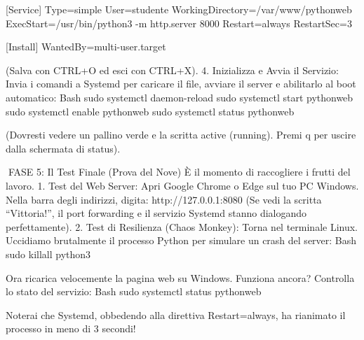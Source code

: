 \documentclass[11pt,a4paper]{article}
\begin{document}
{[}Service{]} Type=simple User=studente
WorkingDirectory=/var/www/pythonweb ExecStart=/usr/bin/python3 -m
http.server 8000 Restart=always RestartSec=3

{[}Install{]} WantedBy=multi-user.target

(Salva con CTRL+O ed esci con CTRL+X). 4. Inizializza e Avvia il
Servizio: Invia i comandi a Systemd per caricare il file, avviare il
server e abilitarlo al boot automatico: Bash sudo systemctl
daemon-reload sudo systemctl start pythonweb sudo systemctl enable
pythonweb sudo systemctl status pythonweb

(Dovresti vedere un pallino verde e la scritta active (running). Premi q
per uscire dalla schermata di status).

FASE 5: Il Test Finale (Prova del Nove) È il momento di raccogliere i
frutti del lavoro. 1. Test del Web Server: Apri Google Chrome o Edge sul
tuo PC Windows. Nella barra degli indirizzi, digita:
http://127.0.0.1:8080 (Se vedi la scritta ``Vittoria!'', il port
forwarding e il servizio Systemd stanno dialogando perfettamente). 2.
Test di Resilienza (Chaos Monkey): Torna nel terminale Linux. Uccidiamo
brutalmente il processo Python per simulare un crash del server: Bash
sudo killall python3

Ora ricarica velocemente la pagina web su Windows. Funziona ancora?
Controlla lo stato del servizio: Bash sudo systemctl status pythonweb

Noterai che Systemd, obbedendo alla direttiva Restart=always, ha
rianimato il processo in meno di 3 secondi!


\end{document}
